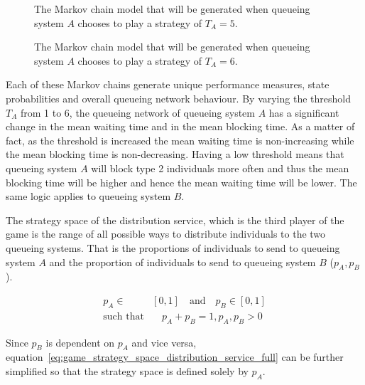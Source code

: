 \begin{figure}[H]
    \centering
    \scalebox{0.8}{
        
    }
    \caption{The Markov chain model that will be generated when queueing system
    \(A\) chooses to play a strategy of \(T_A = 5\).}
\end{figure}

\begin{figure}[H]
    \centering
    \scalebox{0.8}{
        
    }
    \caption{The Markov chain model that will be generated when queueing system
    \(A\) chooses to play a strategy of \(T_A = 6\).}
    \label{fig:game_strategy_visualisation_N_6_M_3_last}
\end{figure}

Each of these Markov chains generate unique performance measures, state
probabilities and overall queueing network behaviour.
By varying the threshold \(T_A\) from 1 to 6, the queueing network of queueing
system \(A\) has a significant change in the mean waiting time and in the mean
blocking time.
As a matter of fact, as the threshold is increased the mean waiting time is
non-increasing while the mean blocking time is non-decreasing.
Having a low threshold means that queueing system \(A\) will block type 2
individuals more often and thus the mean blocking time will be higher and
hence the mean waiting time will be lower.
The same logic applies to queueing system \(B\).

The strategy space of the distribution service, which is the third player of the
game is the range of all possible ways to distribute individuals to the two
queueing systems.
That is the proportions of individuals to send to queueing system \(A\) and the
proportion of individuals to send to queueing system \(B\) (\(p_A, p_B\)).

\begin{align}
    p_A \in & [0, 1] \quad \text{and} \quad p_B \in [0, 1] \nonumber \\
    \text{such that} & \quad p_A + p_B = 1, p_A, p_B > 0
    \label{eq:game_strategy_space_distribution_service_full}
\end{align}

Since \(p_B\) is dependent on \(p_A\) and vice versa,
equation~\eqref{eq:game_strategy_space_distribution_service_full} can be further
simplified so that the strategy space is defined solely by \(p_A\).

